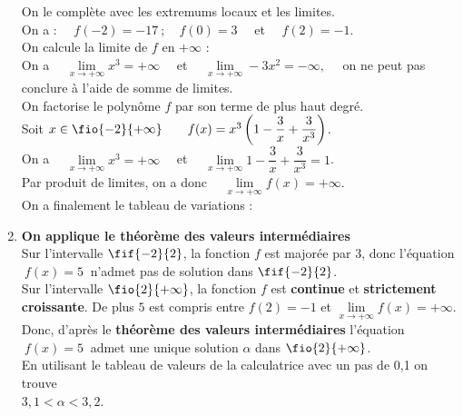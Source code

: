 \documentclass[a4paper,11pt,cours]{nsi} %
\begin{document}
\begin{methode}
\begin{enumerate}[label=\textbullet]
		On le complète avec les extremums locaux et les limites.\\[.5em]
		On a : $\quad f(-2)=-17\ ;\quad f(0)= 3\quad$ et $\quad f(2)=-1$.\\[.5em]
		On calcule la limite de $f$ en $+\infty$ :\\ 
		On a $\quad \lim\limits_{x\to+\infty}x^3=+\infty\quad$ et $\quad \lim\limits_{x\to+\infty}-3x^2=-\infty, \quad$ on ne peut pas conclure à l'aide de somme de limites.\\[.5em]
		\faLightbulb\hspace*{.3cm}On factorise le polynôme $f$ par son terme de plus haut degré.\\
		Soit $x\in\fio{-2}{+\infty}\qquad f(x)=x^3\left(1-\dfrac{3}{x}+\dfrac{3}{x^3}\right)$.\\
		On a $\quad \lim\limits_{x\to +\infty}x^3=+\infty\quad$ et $\quad \lim\limits_{x\to+\infty}1-\dfrac{3}{x}+\dfrac{3}{x^3}=1$.\\[.5em]
		Par produit de limites, on a donc $\quad \lim\limits_{x\to+\infty}f(x)=+\infty$.\\[1em]
		On a finalement le tableau de variations :
		\begin{center}
			\end{center}
		\item \textbf{On applique le théorème des valeurs intermédiaires}\\[.5em]
		Sur l'intervalle $\fif{-2}{2}$, la fonction $f$ est majorée par $3$, donc l'équation $\ f(x)=5\ $ n'admet pas de solution dans $\fif{-2}{2}$.\\[1em]
		Sur l'intervalle $\fio{2}{+\infty}$, la fonction $f$ est \textbf{continue} et \textbf{strictement croissante}. De plus $5$ est compris entre $f(2)=-1$ et $\lim\limits_{x\to+\infty}f(x)=+\infty$.\\
		Donc, d'après le \textbf{théorème des valeurs intermédiaires} l'équation $\ f(x)=5\ $ admet une unique solution $\alpha$ dans $\fio{2}{+\infty}$.\\[.5em]
		\faCalculator \hspace*{.3cm} En utilisant le tableau de valeurs de la calculatrice avec un pas de 0,1 on trouve\\ $3,1<\alpha<3,2$.
	\end{enumerate}
\end{methode}
\end{document}
